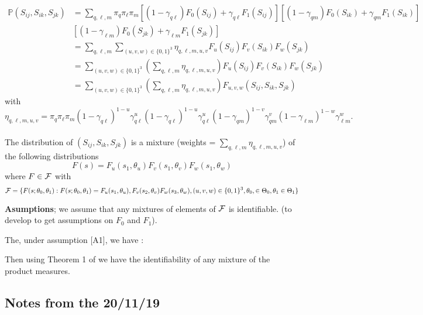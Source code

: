 \begin{align*}
\mathbb{P}(S_{ij},S_{ik}, S_{jk}) &= \sum_{q,\ell,m} \pi_{q} \pi_{\ell} \pi_{m} [ (1-\gamma_{q\ell})F_0(S_{ij}) + \gamma_{q\ell} F_1(S_{ij} )] [(1-\gamma_{qm})F_0(S_{ik}) + \gamma_{qm} F_1(S_{ik})]\\
&   [ (1-\gamma_{\ell m})F_0(S_{jk}) + \gamma_{\ell m} F_1(S_{jk})]\\
&= \sum_{q, \ell,m} \sum_{(u,v,w) \in \{0,1\}^3}  \eta_{q,\ell,m,u,v} F_{u}(S_{ij}) F_{v}(S_{ik}) F_{w}(S_{jk})\\
&= \sum_{(u,v,w) \in \{0,1\}^3}  \left(\sum_{q, \ell,m} \eta_{q,\ell,m,u,v}\right) F_{u}(S_{ij}) F_{v}(S_{ik}) F_{w}(S_{jk})\\
&=  \sum_{(u,v,w) \in \{0,1\}^3}  \left(\sum_{q, \ell,m} \eta_{q,\ell,m,u,v}\right) F_{u,v,w}(S_{ij},S_{ik},S_{jk})
\end{align*}
with $$\eta_{q,\ell,m,u,v} = \pi_{q} \pi_{\ell} \pi_{m} (1 - \gamma_{q\ell})^{1-u}   \gamma_{q\ell} ^{u}  (1 - \gamma_{q\ell})^{1-u}   \gamma_{q\ell} ^{u}  (1 - \gamma_{qm})^{1-v}   \gamma_{qm} ^{v} (1 - \gamma_{\ell m })^{1-w}   \gamma_{\ell m } ^{w}.$$  \\
The distribution of $(S_{ij},S_{ik}, S_{jk})$ is a mixture  (weights  = $ \sum_{q, \ell,m} \eta_{q,\ell,m,u,v}$) of   the following distributions 
$$ F (s) =  F_u(s_1,\theta_u) F_v(s_1,\theta_v)  F_w(s_1,\theta_w) $$ 
where $F \in \mathcal{F}$   with 
$$ \mathcal{F}  = \{ F (s; \theta_0, \theta_1)  :  F (s; \theta_0, \theta_1)  = F_u(s_1,\theta_u),F_v(s_2,\theta_v) F_w(s_3,\theta_w) , (u,v,w) \in \{0,1\}^3,  \theta_0, \in \Theta_0, \theta_1 \in \Theta_1\}$$


\noindent \textbf{Asumptions};  
\noindent  [A1]  we assume that any mixtures of elements of $\mathcal{F}$ is identifiable.  (to develop to get assumptions on $F_0$ and $F_1$). 



The, under assumption [A1], we have : 



Then using Theorem 1 of \cite{T67} we have the identifiability of any mixture of the  product  measures. 




\subsection{Notes from the 20/11/19}

